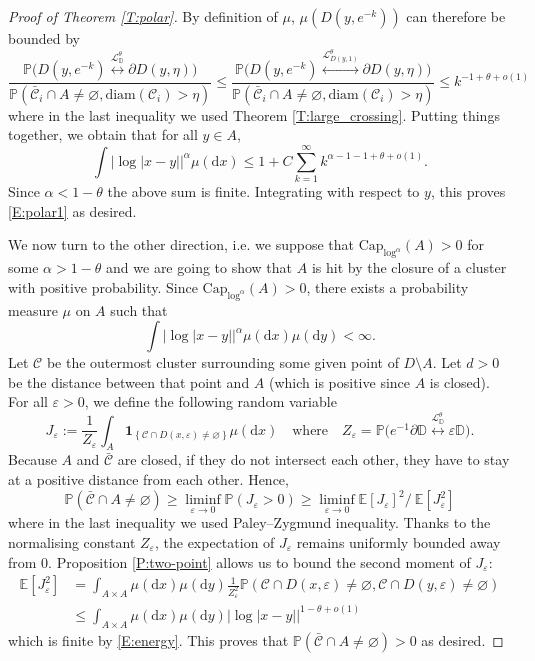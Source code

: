 \documentclass[11pt]{article}
\theoremstyle{remark}
\newcommand{\D}{\mathbb{D}}
\newcommand{\Cc}{\mathcal{C}}
\newcommand{\Lc}{\mathcal{L}}
\newcommand{\Expect}[1]{\mathbb{E} \left[ #1 \right] }
\newcommand{\Prob}[1]{\mathbb{P} \left( #1 \right) }
\renewcommand{\P}{\mathbb{P}}
\newcommand{\indic}[1]{ \mathbf{1}_{ \left\{ #1 \right\} } }
\newcommand{\eps}{\varepsilon}
\renewcommand{\d}{\mathrm{d}}
\renewcommand{\Cap}{\mathrm{Cap}}
\numberwithin{equation}{section}
\begin{document}
\begin{proof}[Proof of Theorem \ref{T:polar}]
By definition of $\mu$, $\mu ( D(y,e^{-k}))$ can therefore be bounded by
\[
\frac{\P \Big( D(y,e^{-k}) \overset{\Lc_\D^\theta}{\longleftrightarrow} \partial D(y,\eta) \Big) }{ \Prob{ \bar{\Cc}_i \cap A \neq \varnothing, \text{diam}(\Cc_i)>\eta } }
\leq \frac{\P \Big( D(y,e^{-k}) \overset{\Lc_{D(y,1)}^\theta}{\longleftrightarrow} \partial D(y,\eta) \Big) }{ \Prob{ \bar{\Cc}_i \cap A \neq \varnothing, \text{diam}(\Cc_i)>\eta } } \leq k^{-1+\theta +o(1)}
\]
where in the last inequality we used Theorem \ref{T:large_crossing}. Putting things together, we obtain that for all $y \in A$,
\[
\int |\log |x-y||^\alpha \mu(\d x) \leq 1 + C \sum_{k=1}^\infty k^{\alpha-1 - 1+\theta + o(1)}.
\]
Since $\alpha < 1-\theta$ the above sum is finite. Integrating with respect to $y$, this proves \eqref{E:polar1} as desired.

We now turn to the other direction, i.e. we suppose that $\Cap_{\log^\alpha}(A) >0$ for some $\alpha > 1-\theta$ and we are going to show that $A$ is hit by the closure of a cluster with positive probability. Since $\Cap_{\log^\alpha}(A) >0$, there exists a probability measure $\mu$ on $A$ such that
\begin{equation}
\label{E:energy}
\int |\log |x-y||^\alpha \mu(\d x) \mu(\d y) < \infty.
\end{equation}
Let $\Cc$ be the outermost cluster surrounding some given point of $D \setminus A$. Let $d >0$ be the distance between that point and $A$ (which is positive since $A$ is closed).
For all $\eps >0$, we define the following random variable
\[
J_\eps := \frac{1}{Z_\eps} \int_A \indic{\Cc \cap D(x,\eps) \neq \varnothing} \mu(\d x)
\quad \text{where} \quad
Z_\eps = \P \Big( e^{-1} \partial \D \overset{\Lc_{\D}^\theta}{\longleftrightarrow} \eps \D \Big).
\]
Because $A$ and $\bar{\Cc}$ are closed, if they do not intersect each other, they have to stay at a positive distance from each other. Hence,
\[
\Prob{ \bar{\Cc} \cap A \neq \varnothing } \geq \liminf_{\eps \to 0} \Prob{J_\eps >0} \geq \liminf_{\eps \to 0} \Expect{J_\eps}^2 / ~\Expect{J_\eps^2}
\]
where in the last inequality we used Paley--Zygmund inequality. Thanks to the normalising constant $Z_\eps$, the expectation of $J_\eps$ remains uniformly bounded away from 0. Proposition \ref{P:two-point} allows us to bound the second moment of $J_\eps$:
\begin{align*}
\Expect{J_\eps^2} & = \int_{A \times A} \mu(\d x) \mu(\d y) \frac{1}{Z_\eps^2} \Prob{ \Cc \cap D(x,\eps) \neq \varnothing, \Cc \cap D(y,\eps) \neq \varnothing } \\
& \leq \int_{A \times A} \mu(\d x) \mu(\d y) |\log |x-y||^{1-\theta+o(1)}
\end{align*}
which is finite by \eqref{E:energy}. This proves that $\Prob{ \bar{\Cc} \cap A \neq \varnothing } >0$ as desired.
\end{proof}
\end{document}

